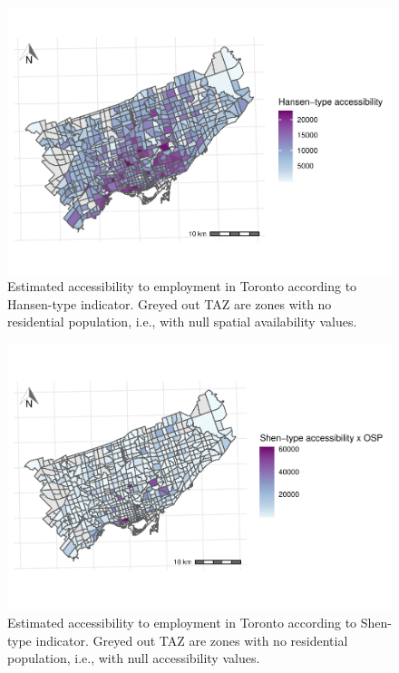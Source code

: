 \documentclass[]{elsarticle} %
\begin{document}
\begin{figure}
\includegraphics[width=1\linewidth]{Spatial-Availability-Refreshed_files/figure-latex/absolute-accessibility-plot-S_i-1} \caption{\label{fig:plot-Hansen-Type-S-TO}Estimated accessibility to employment in Toronto according to Hansen-type indicator. Greyed out TAZ are zones with no residential population, i.e., with null spatial availability values.}\label{fig:absolute-accessibility-plot-S_i}
\end{figure}

\begin{figure}
\includegraphics[width=1\linewidth]{Spatial-Availability-Refreshed_files/figure-latex/absolute-accessibility-plot-A2_i-1} \caption{\label{fig:plot-Shen-type-A-TO}Estimated accessibility to employment in Toronto according to Shen-type indicator. Greyed out TAZ are zones with no residential population, i.e., with null accessibility values.}\label{fig:absolute-accessibility-plot-A2_i}
\end{figure}
\end{document}
